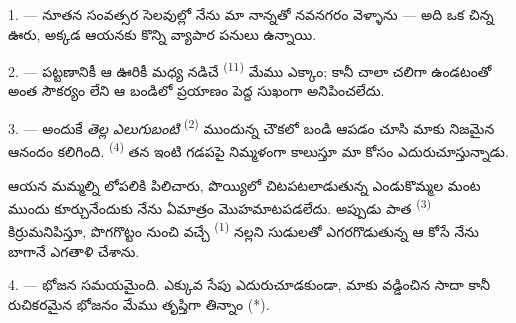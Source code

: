 %
%
%


\VUsaut{4.0mm}
\VUsaut{3.0mm}
\VUfilet{16mm}
\VUsaut{5.6mm}
\VUsaut{3.0mm}

\VUsaut{3.0mm}

\VUsaut{4.0mm}

1. --- నూతన సంవత్సర సెలవుల్లో నేను మా నాన్నతో నవనగరం వెళ్ళాను — అది ఒక చిన్న ఊరు, అక్కడ ఆయనకు
కొన్ని వ్యాపార పనులు ఉన్నాయి.

2. --- పట్టణానికీ ఆ ఊరికీ మధ్య నడిచే  \textsuperscript{(11)} మేము ఎక్కాం;
కానీ చాలా చలిగా ఉండటంతో అంత సౌకర్యం లేని ఆ బండిలో ప్రయాణం పెద్ద సుఖంగా అనిపించలేదు.

3. --- అందుకే  \textit{తెల్ల ఎలుగుబంటి}  \textsuperscript{(2)}
ముందున్న చౌకలో బండి ఆపడం చూసి మాకు నిజమైన ఆనందం కలిగింది. 
\textsuperscript{(4)} తన ఇంటి గడపపై నిమ్మళంగా  కాలుస్తూ మా కోసం
ఎదురుచూస్తున్నాడు.

ఆయన మమ్మల్ని లోపలికి పిలిచారు, పొయ్యిలో చిటపటలాడుతున్న ఎండుకొమ్మల మంట ముందు కూర్చునేందుకు నేను
ఏమాత్రం మొహమాటపడలేదు. అప్పుడు పాత  \textsuperscript{(3)} కిర్రుమనిపిస్తూ,
పొగగొట్టం నుంచి వచ్చే  \textsuperscript{(1)} నల్లని సుడులతో ఎగరగొడుతున్న ఆ కోసే
 నేను బాగానే ఎగతాళి చేశాను.

4. --- భోజన సమయమైంది. ఎక్కువ సేపు ఎదురుచూడకుండా, మాకు వడ్డించిన సాదా కానీ రుచికరమైన భోజనం మేము
తృప్తిగా తిన్నాం (*).

